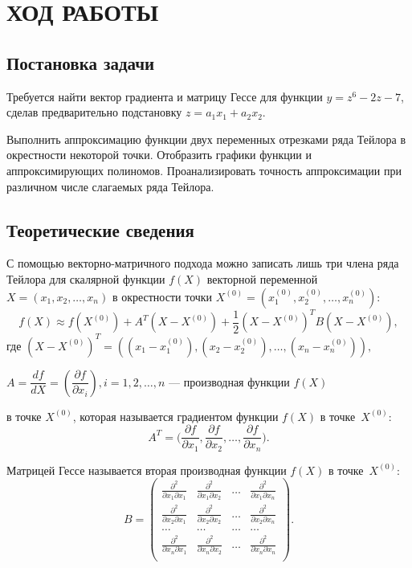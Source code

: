\section{ХОД РАБОТЫ}

\subsection{Постановка задачи}

Требуется найти вектор градиента и матрицу Гессе для функции $y = z^6 - 2z - 7$,
сделав предварительно подстановку $z = a_1x_1 + a_2x_2$.

Выполнить аппроксимацию функции двух переменных отрезками ряда Тейлора
в окрестности некоторой точки. Отобразить графики функции и аппроксимирующих
полиномов. Проанализировать точность аппроксимации при различном числе
слагаемых ряда Тейлора.


\subsection{Теоретические сведения}
\label{sub:theory}

С помощью векторно-матричного подхода можно записать лишь три члена
ряда Тейлора для скалярной функции $f(X)$ векторной переменной
$X = (x_1, x_2, \dots, x_n)$ в окрестности
точки $X^{(0)} = (x_1^{(0)}, x_2^{(0)}, \dots, x_n^{(0)})$:
\begin{equation*}
  f(X) \approx f(X^{(0)}) + A^T (X-X^{(0)}) + \dfrac{1}{2} (X-X^{(0)})^T B(X-X^{(0)}),
\end{equation*}
где \hspace{1.5mm}  $(X-X^{(0)})^T = ((x_1 - x_1^{(0)}), (x_2 - x_2^{(0)}), \dots, (x_n - x_n^{(0)})), $ \par
                  $A = \dfrac{df}{dX} = (\dfrac{\partial f}{\partial x_i}), i = 1,2,\dots,n$ ---
                  производная функции $f(X)$ \par 
                  в точке $X^{(0)}$, которая называется градиентом функции $f(X)$ в точке~$X^{(0)}$:
\begin{equation*}
  A^T = \bigg( \dfrac{\partial f}{\partial x_1}, \dfrac{\partial f}{\partial x_2}, \dots, \dfrac{\partial f}{\partial x_n} \bigg).
\end{equation*}

Матрицей Гессе называется вторая производная функции $f(X)$ в точке~$X^{(0)}$:
\[
  B =
    \left(
      \begin{array}{cccc}
        \frac{\partial^2}{\partial x_1 \partial x_1} & \frac{\partial^2}{\partial x_1 \partial x_2} & \dots & \frac{\partial^2}{\partial x_1 \partial x_n} \\
        \frac{\partial^2}{\partial x_2 \partial x_1} & \frac{\partial^2}{\partial x_2 \partial x_2} & \dots & \frac{\partial^2}{\partial x_2 \partial x_n} \\
        \dots & \dots & \dots & \dots \\
        \frac{\partial^2}{\partial x_n \partial x_1} & \frac{\partial^2}{\partial x_n \partial x_2} & \dots & \frac{\partial^2}{\partial x_n \partial x_n} \\
      \end{array}
    \right).
\]


